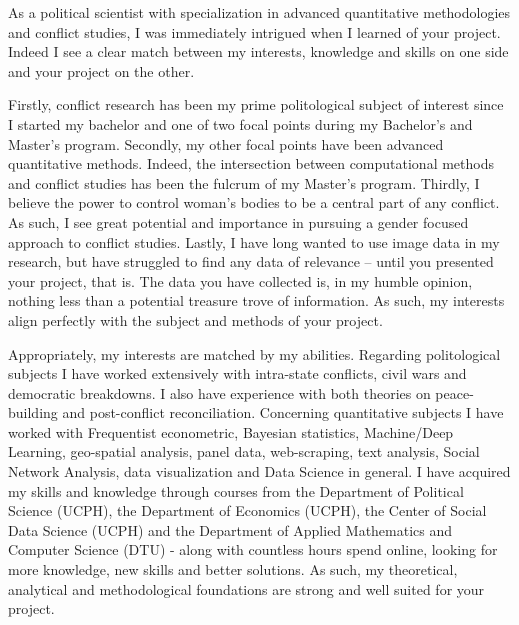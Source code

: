 \documentclass[a4paper]{article}
\begin{document}

As a political scientist with specialization in advanced quantitative methodologies and conflict studies, I was immediately intrigued when I learned of your project. Indeed I see a clear match between my interests, knowledge and skills on one side and your project on the other.\par

Firstly, conflict research has been my prime politological subject of interest since I started my bachelor and one of two focal points during my Bachelor's and Master's program. Secondly, my other focal points have been advanced quantitative methods. Indeed, the intersection between computational methods and conflict studies has been the fulcrum of my Master's program. Thirdly, I believe the power to control woman's bodies to be a central part of any conflict. As such, I see great potential and importance in pursuing a gender focused approach to conflict studies. Lastly, I have long wanted to use image data in my research, but have struggled to find any data of relevance -- until you presented your project, that is. The data you have collected is, in my humble opinion, nothing less than a potential treasure trove of information. As such, my interests align perfectly with the subject and methods of your project.\par

Appropriately, my interests are matched by my abilities. Regarding politological subjects I have worked extensively with intra-state conflicts, civil wars and democratic breakdowns. I also have experience with both theories on peace-building and post-conflict reconciliation. Concerning quantitative subjects I have worked with Frequentist econometric, Bayesian statistics, Machine/Deep Learning, geo-spatial analysis, panel data, web-scraping, text analysis, Social Network Analysis, data visualization and Data Science in general. I have acquired my skills and knowledge through courses from the Department of Political Science (UCPH), the Department of Economics (UCPH), the Center of Social Data Science (UCPH) and the Department of Applied Mathematics and Computer Science (DTU) - along with countless hours spend online, looking for more knowledge, new skills and better solutions. As such, my theoretical, analytical and methodological foundations are strong and well suited for your project.\par %
\end{document}
